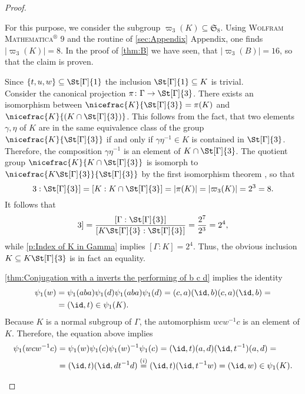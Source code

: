 \begin{proof}
\begin{plist}
For this purpose, we consider the subgroup $\varpi_3(K)\subseteq \mathfrak{S}_8$. Using \textsc{Wolfram Mathematica$^\circledR$ 9} and the routine of \ref{sec:Appendix} Appendix, one finds $\lvert\varpi_3(K)\rvert=8$. In the proof of \cref{thm:B} we have seen, that $\lvert\varpi_3(B)\rvert=16$, so that the claim is proven.
\item Since $\lbrace t,u,w\rbrace\subseteq\St[\Gamma]{1}$ the inclusion $\St[\Gamma]{1}\subseteq K$ is trivial.\\
Consider the canonical projection $\pi\colon\Gamma\to\St[\Gamma]{3}$. There exists an isomorphism between $\nicefrac{K}{\St[\Gamma]{3}}=\pi(K)$ and $\nicefrac{K}{(K\cap\St[\Gamma]{3})}$. This follows from the fact, that two elements $\gamma,\eta$ of $K$ are in the same equivalence class of the group $\nicefrac{K}{\St[\Gamma]{3}}$ if and only if $\gamma\eta^{-1}\in K$ is contained in $\St[\Gamma]{3}$. Therefore, the composition $\gamma\eta^{-1}$ is an element of $K\cap\St[\Gamma]{3}$. The quotient group $\nicefrac{K}{K\cap\St[\Gamma]{3}}$ is isomorph to $\nicefrac{K\St[\Gamma]{3}}{\St[\Gamma]{3}}$ by the first isomorphism theorem , so that
\begin{equation*}
[K\St[\Gamma]{3}:\St[\Gamma]{3}]=[K:K\cap\St[\Gamma]{3}]=\lvert \pi(K)\rvert=\lvert\varpi_3(K)\rvert=2^3=8.
\end{equation*}
It follows that
\begin{equation*}
[\Gamma:K\St[\Gamma]{3}]=\frac{[\Gamma:\St[\Gamma]{3}]}{[K\St[\Gamma]{3}:\St[\Gamma]{3}]}=\frac{2^7}{2^3}=2^4,
\end{equation*}
while \ref{p:Index of K in Gamma} implies $[\Gamma:K]=2^4.$ Thus, the obvious inclusion $K\subseteq K\St[\Gamma]{3}$ is in fact an equality.
\item \label{p:Base Case psi(K) contains K} \cref{thm:Conjugation with a inverts the performing of b c d} implies the identity
\begin{align*}
\psi_1(w)	&=\psi_1(aba)\psi_1(d)\psi_1(aba)\psi_1(d)=(c,a)(\id,b)(c,a)(\id,b)=\\
			&=(\id,t)\in\psi_1(K).
\end{align*}
Because $K$ is a normal subgroup of $\Gamma$, the automorphism $wcw^{-1}c$ is an element of $K$. Therefore, the equation above implies
\begin{align*}
\psi_1(wcw^{-1}c)	&=\psi_1(w)\psi_1(c)\psi_1(w)^{-1}\psi_1(c)=(\id,t)(a,d)(\id,t^{-1})(a,d)=\\
					&=(\id,t)(\id,dt^{-1}d)\overset{(i)}{=}(\id,t)(\id,t^{-1}w)=(\id,w)\in\psi_1(K).

\end{align*}
\end{plist}
\end{proof}
